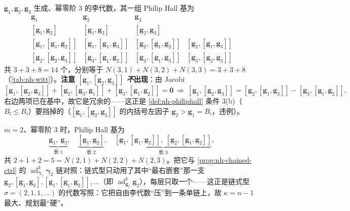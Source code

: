 \begin{example}\label{ex:nh-phall3}
$\mathbf{g}_1,\mathbf{g}_2,\mathbf{g}_3$ 生成、幂零阶 $3$ 的李代数，其一组 Philip Hall 基为
\[
\begin{array}{llll}
\mathbf{g}_1 & \mathbf{g}_2 & \mathbf{g}_3 & \\[2pt]
[\mathbf{g}_1,\mathbf{g}_2] & [\mathbf{g}_1,\mathbf{g}_3] & [\mathbf{g}_2,\mathbf{g}_3] & \\[2pt]
[\mathbf{g}_1,[\mathbf{g}_1,\mathbf{g}_2]] & [\mathbf{g}_1,[\mathbf{g}_1,\mathbf{g}_3]] & [\mathbf{g}_2,[\mathbf{g}_1,\mathbf{g}_2]] & [\mathbf{g}_2,[\mathbf{g}_1,\mathbf{g}_3]] \\[2pt]
[\mathbf{g}_2,[\mathbf{g}_2,\mathbf{g}_3]] & [\mathbf{g}_3,[\mathbf{g}_1,\mathbf{g}_2]] & [\mathbf{g}_3,[\mathbf{g}_1,\mathbf{g}_3]] & [\mathbf{g}_3,[\mathbf{g}_2,\mathbf{g}_3]]
\end{array}
\]
共 $3+3+8=14$ 个，分别等于 $N(3,1)+N(3,2)+N(3,3)=3+3+8$（\cref{tab:nh-witt}）。\textbf{注意 $[\mathbf{g}_1,[\mathbf{g}_2,\mathbf{g}_3]]$ \emph{不}出现}：由 Jacobi
\[
  [\mathbf{g}_1,[\mathbf{g}_2,\mathbf{g}_3]]+[\mathbf{g}_2,[\mathbf{g}_3,\mathbf{g}_1]]+[\mathbf{g}_3,[\mathbf{g}_1,\mathbf{g}_2]]=\mathbf 0
  \ \Longrightarrow\
  [\mathbf{g}_1,[\mathbf{g}_2,\mathbf{g}_3]]=[\mathbf{g}_2,[\mathbf{g}_1,\mathbf{g}_3]]-[\mathbf{g}_3,[\mathbf{g}_1,\mathbf{g}_2]],
\]
右边两项已在基中，故它是冗余的——这正是 \cref{def:nh-philiphall} 条件 3(b)（$B_l\le B_i$）要挡掉的（$[\mathbf{g}_1,[\mathbf{g}_2,\mathbf{g}_3]]$ 的内括号左因子 $\mathbf{g}_2>\mathbf{g}_1=B_i$，违例）。
\end{example}

\begin{example}\label{ex:nh-phall2}
$m=2$、幂零阶 $3$ 时，Philip Hall 基为
\[
  \underbrace{\mathbf{g}_1,\ \mathbf{g}_2}_{\text{长 }1},\quad
  \underbrace{[\mathbf{g}_1,\mathbf{g}_2]}_{\text{长 }2},\quad
  \underbrace{[\mathbf{g}_1,[\mathbf{g}_1,\mathbf{g}_2]],\ [\mathbf{g}_2,[\mathbf{g}_1,\mathbf{g}_2]]}_{\text{长 }3},
\]
共 $2+1+2=5=N(2,1)+N(2,2)+N(2,3)$。把它与 \cref{prop:nh-chained-ctrl} 的 $\operatorname{ad}_{\boldsymbol{\gamma}_1}^k\boldsymbol{\gamma}_2$ 链对照：链式型只动用了其中“最右嵌套”那一支 $\mathbf{g}_2,[\mathbf{g}_1,\mathbf{g}_2],[\mathbf{g}_1,[\mathbf{g}_1,\mathbf{g}_2]],\dots$（即 $\operatorname{ad}_{\mathbf{g}_1}^k\mathbf{g}_2$），每层只取一个——这正是链式型 $\sigma=(2,1,1,\dots)$ 的代数写照：它把自由李代数“压”到一条单链上，故 $\kappa=n-1$ 最大、规划最“硬”。
\end{example}

